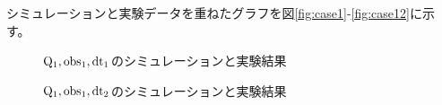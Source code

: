 \documentclass[a4j,11pt,twoside]{ujbook}
\begin{document}
		シミュレーションと実験データを重ねたグラフを図\ref{fig:case1}-\ref{fig:case12}に示す。
		
		\begin{figure}[htbp]
			\centering
			\hspace{5mm}
			\caption{${\rm Q_1,obs_1,dt_1}$のシミュレーションと実験結果}\label{case1}
		\end{figure}
		
		
		\begin{figure}[htbp]
			\centering
			\hspace{5mm}
			\caption{${\rm Q_1,obs_1,dt_2}$のシミュレーションと実験結果}\label{case2}
		\end{figure}
		
\end{document}
